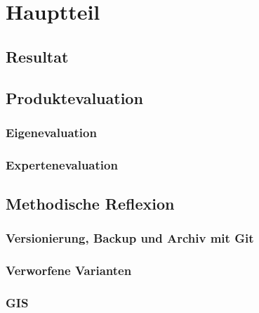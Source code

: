 \section{Hauptteil}
\subsection{Resultat}

\subsection{Produktevaluation}
\subsubsection{Eigenevaluation}
\subsubsection{Expertenevaluation}

\subsection{Methodische Reflexion}
\subsubsection{Versionierung, Backup und Archiv mit Git}
\subsubsection{Verworfene Varianten}
\subsubsection{GIS}